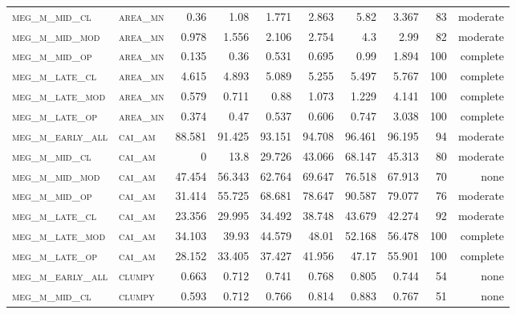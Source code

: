 \begin{landscape}
\begin{center}
\begin{footnotesize}
\begin{longtable}{llrrrrr|rrr}
\textsc{meg\_m\_mid\_cl   } & \textsc{area\_mn  }   & 0.36     & 1.08     & 1.771    & 2.863    & 5.82     & 3.367    & 83  & moderate \\
\textsc{meg\_m\_mid\_mod  } & \textsc{area\_mn  }   & 0.978    & 1.556    & 2.106    & 2.754    & 4.3      & 2.99     & 82  & moderate \\
\textsc{meg\_m\_mid\_op   } & \textsc{area\_mn  }   & 0.135    & 0.36     & 0.531    & 0.695    & 0.99     & 1.894    & 100 & complete \\
\textsc{meg\_m\_late\_cl  } & \textsc{area\_mn  }   & 4.615    & 4.893    & 5.089    & 5.255    & 5.497    & 5.767    & 100 & complete \\
\textsc{meg\_m\_late\_mod } & \textsc{area\_mn  }   & 0.579    & 0.711    & 0.88     & 1.073    & 1.229    & 4.141    & 100 & complete \\
\textsc{meg\_m\_late\_op  } & \textsc{area\_mn  }   & 0.374    & 0.47     & 0.537    & 0.606    & 0.747    & 3.038    & 100 & complete \\
\textsc{meg\_m\_early\_all} & \textsc{cai\_am   }   & 88.581   & 91.425   & 93.151   & 94.708   & 96.461   & 96.195   & 94  & moderate \\
\textsc{meg\_m\_mid\_cl   } & \textsc{cai\_am   }   & 0        & 13.8     & 29.726   & 43.066   & 68.147   & 45.313   & 80  & moderate \\
\textsc{meg\_m\_mid\_mod  } & \textsc{cai\_am   }   & 47.454   & 56.343   & 62.764   & 69.647   & 76.518   & 67.913   & 70  & none     \\
\textsc{meg\_m\_mid\_op   } & \textsc{cai\_am   }   & 31.414   & 55.725   & 68.681   & 78.647   & 90.587   & 79.077   & 76  & moderate \\
\textsc{meg\_m\_late\_cl  } & \textsc{cai\_am   }   & 23.356   & 29.995   & 34.492   & 38.748   & 43.679   & 42.274   & 92  & moderate \\
\textsc{meg\_m\_late\_mod } & \textsc{cai\_am   }   & 34.103   & 39.93    & 44.579   & 48.01    & 52.168   & 56.478   & 100 & complete \\
\textsc{meg\_m\_late\_op  } & \textsc{cai\_am   }   & 28.152   & 33.405   & 37.427   & 41.956   & 47.17    & 55.901   & 100 & complete \\
\textsc{meg\_m\_early\_all} & \textsc{clumpy    }   & 0.663    & 0.712    & 0.741    & 0.768    & 0.805    & 0.744    & 54  & none     \\
\textsc{meg\_m\_mid\_cl   } & \textsc{clumpy    }   & 0.593    & 0.712    & 0.766    & 0.814    & 0.883    & 0.767    & 51  & none     \\

\end{longtable}
\end{footnotesize}
\end{center}
\end{landscape}
